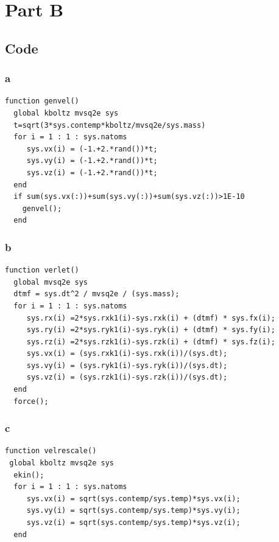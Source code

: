 \documentclass{article}
\begin{document}
\section*{Part B}

\subsection*{Code}
\subsubsection*{a}
\begin{verbatim}
function genvel()
  global kboltz mvsq2e sys
  t=sqrt(3*sys.contemp*kboltz/mvsq2e/sys.mass)
  for i = 1 : 1 : sys.natoms
     sys.vx(i) = (-1.+2.*rand())*t;
     sys.vy(i) = (-1.+2.*rand())*t;
     sys.vz(i) = (-1.+2.*rand())*t;
  end
  if sum(sys.vx(:))+sum(sys.vy(:))+sum(sys.vz(:))>1E-10
    genvel();
  end
\end{verbatim}
\subsubsection*{b}
\begin{verbatim}
function verlet()
  global mvsq2e sys
  dtmf = sys.dt^2 / mvsq2e / (sys.mass);
  for i = 1 : 1 : sys.natoms
     sys.rx(i) =2*sys.rxk1(i)-sys.rxk(i) + (dtmf) * sys.fx(i);
     sys.ry(i) =2*sys.ryk1(i)-sys.ryk(i) + (dtmf) * sys.fy(i);
     sys.rz(i) =2*sys.rzk1(i)-sys.rzk(i) + (dtmf) * sys.fz(i);     
     sys.vx(i) = (sys.rxk1(i)-sys.rxk(i))/(sys.dt);
     sys.vy(i) = (sys.ryk1(i)-sys.ryk(i))/(sys.dt);
     sys.vz(i) = (sys.rzk1(i)-sys.rzk(i))/(sys.dt);
  end
  force();
\end{verbatim}
\subsubsection*{c}
\begin{verbatim}
function velrescale()
 global kboltz mvsq2e sys
  ekin();
  for i = 1 : 1 : sys.natoms
     sys.vx(i) = sqrt(sys.contemp/sys.temp)*sys.vx(i);
     sys.vy(i) = sqrt(sys.contemp/sys.temp)*sys.vy(i);
     sys.vz(i) = sqrt(sys.contemp/sys.temp)*sys.vz(i);
  end
\end{verbatim}
\end{document}
